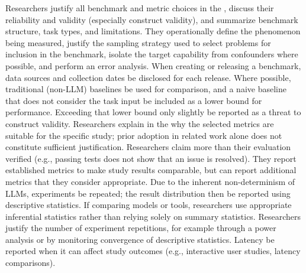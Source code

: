 Researchers \must justify all benchmark and metric choices in the \paper, \must discuss their reliability and validity (especially construct validity), and \should summarize benchmark structure, task types, and limitations. They \should operationally define the phenomenon being measured, justify the sampling strategy used to select problems for inclusion in the benchmark, isolate the target capability from confounders where possible, and perform an error analysis. When creating or releasing a benchmark, data sources and collection dates \must be disclosed for each release. Where possible, traditional (non-LLM) baselines \should be used for comparison, and a naive baseline that does not consider the task input \should be included as a lower bound for performance. Exceeding that lower bound only slightly \must be reported as a threat to construct validity. Researchers \must explain in the \paper why the selected metrics are suitable for the specific study; prior adoption in related work alone does not constitute sufficient justification. Researchers \mustnot claim more than their evaluation verified (e.g., passing tests does not show that an issue is resolved). They \should report established metrics to make study results comparable, but can report additional metrics that they consider appropriate. Due to the inherent non-determinism of LLMs, experiments \should be repeated; the result distribution \should then be reported using descriptive statistics. If comparing models or tools, researchers \should use appropriate inferential statistics rather than relying solely on summary statistics. Researchers \should justify the number of experiment repetitions, for example through a power analysis or by monitoring convergence of descriptive statistics. Latency \must be reported when it can affect study outcomes (e.g., interactive user studies, latency comparisons).
